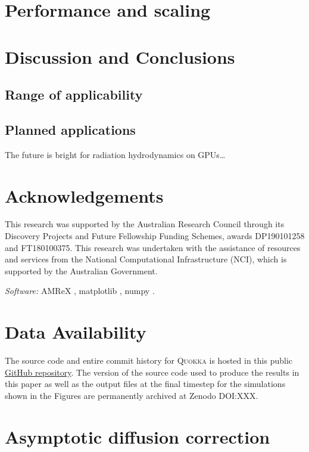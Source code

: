 \documentclass[fleqn,usenatbib]{mnras}
\begin{document}
\section{Performance and scaling}
\label{section:performance}

\section{Discussion and Conclusions}
\label{section:discussion}
\subsection{Range of applicability}
\subsection{Planned applications}

The future is bright for radiation hydrodynamics on GPUs\dots

\section*{Acknowledgements}

This research was supported by the Australian Research Council through its Discovery Projects and Future Fellowship Funding Schemes, awards DP190101258 and FT180100375. This research was undertaken with the assistance of resources and services from the National Computational Infrastructure (NCI), which is supported by the Australian Government.

\emph{Software:} AMReX \citep{the_amrex_development_team_2021_5363443},
matplotlib \citep{Hunter:2007},
numpy \citep{harris2020array}.

\section*{Data Availability}
The source code and entire commit history for \textsc{Quokka} is hosted in this public \faGithub\href{https://github.com/BenWibking/quokka-code}{GitHub repository}. The version of the source code used to produce the results in this paper as well as the output files at the final timestep for the simulations shown in the Figures are permanently archived at Zenodo DOI:XXX.






\appendix
\section{Asymptotic diffusion correction}
\label{appendix:asymptotic_correction}



\bsp	%
\label{lastpage}
\end{document}
